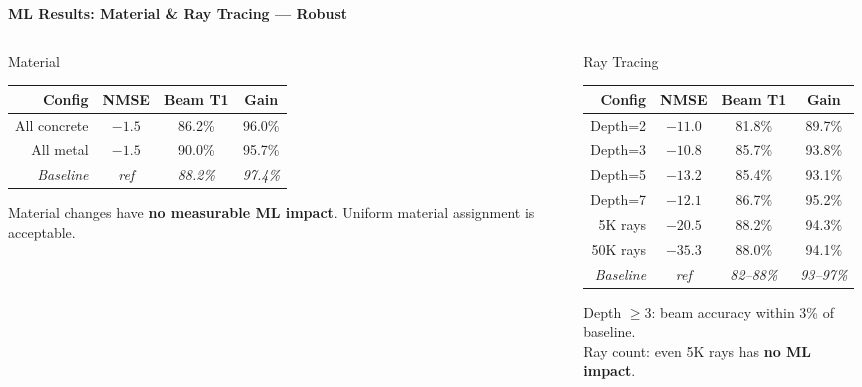 \documentclass[
    aspectratio=169
]{beamer}
\begin{document}
\begin{frame}{\textbf{ML Results: Material \& Ray Tracing --- Robust}}
\vspace{-0.1cm}
\footnotesize
\begin{columns}[T]
\begin{column}{0.48\textwidth}
\begin{block}{Material}
\begin{tabular}{rccc}
\toprule
\textbf{Config} & \textbf{NMSE} & \textbf{Beam T1} & \textbf{Gain} \\
\midrule
All concrete & $-1.5$ & 86.2\% & 96.0\% \\
All metal & $-1.5$ & 90.0\% & 95.7\% \\
\midrule
\textit{Baseline} & \textit{ref} & \textit{88.2\%} & \textit{97.4\%} \\
\bottomrule
\end{tabular}
\vspace{0.2cm}
\footnotesize Material changes have \textbf{no measurable ML impact}. Uniform material assignment is acceptable.
\end{block}
\end{column}
\begin{column}{0.48\textwidth}
\begin{block}{Ray Tracing}
\begin{tabular}{rccc}
\toprule
\textbf{Config} & \textbf{NMSE} & \textbf{Beam T1} & \textbf{Gain} \\
\midrule
Depth=2 & $-11.0$ & 81.8\% & 89.7\% \\
Depth=3 & $-10.8$ & 85.7\% & 93.8\% \\
Depth=5 & $-13.2$ & 85.4\% & 93.1\% \\
Depth=7 & $-12.1$ & 86.7\% & 95.2\% \\
\midrule
5K rays & $-20.5$ & 88.2\% & 94.3\% \\
50K rays & $-35.3$ & 88.0\% & 94.1\% \\
\midrule
\textit{Baseline} & \textit{ref} & \textit{82--88\%} & \textit{93--97\%} \\
\bottomrule
\end{tabular}
\vspace{0.1cm}
\footnotesize Depth $\geq 3$: beam accuracy within 3\% of baseline. \\ Ray count: even 5K rays has \textbf{no ML impact}.
\end{block}
\end{column}
\end{columns}
\end{frame}
\end{document}
